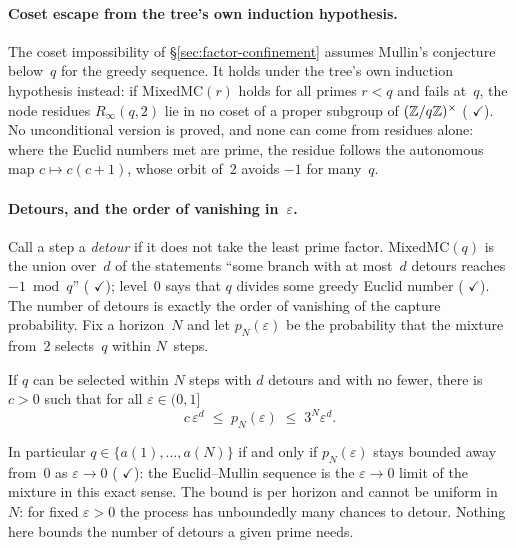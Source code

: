 \paragraph{Coset escape from the tree's own induction hypothesis.}
The coset impossibility of \S\ref{sec:factor-confinement} assumes
Mullin's conjecture below~$q$ for the greedy sequence.  It holds under
the tree's own induction hypothesis instead: if $\mathrm{MixedMC}(r)$
holds for all primes $r < q$ and fails at~$q$, the node residues
$R_\infty(q,2)$ lie in no coset of a proper subgroup of
$(\mathbb{Z}/q\mathbb{Z})^\times$
(
{\color{leanink}$\checkmark$}).
No unconditional version is proved, and none can come from residues
alone: where the Euclid numbers met are prime, the residue follows the
autonomous map $c \mapsto c(c{+}1)$, whose orbit of~$2$ avoids $-1$
for many~$q$.

\paragraph{Detours, and the order of vanishing in~$\varepsilon$.}
Call a step a \emph{detour} if it does not take the least prime
factor.  $\mathrm{MixedMC}(q)$ is the union over~$d$ of the statements
``some branch with at most~$d$ detours reaches $-1 \bmod q$''
( {\color{leanink}$\checkmark$}); level~$0$
says that $q$ divides some greedy Euclid number
( {\color{leanink}$\checkmark$}).
The number of detours is exactly the order of vanishing of the capture
probability.  Fix a horizon~$N$ and let $p_N(\varepsilon)$ be the
probability that the mixture from~$2$ selects~$q$ within $N$~steps.
\begin{theorem}
If $q$ can be selected within $N$ steps with $d$ detours and with no
fewer, there is $c > 0$ such that for all $\varepsilon \in (0,1]$
\[
  c\,\varepsilon^{d} \;\le\; p_N(\varepsilon) \;\le\; 3^{N}\varepsilon^{d}.
\]
\end{theorem}
\noindent
In particular $q \in \{a(1),\dots,a(N)\}$ if and only if
$p_N(\varepsilon)$ stays bounded away from~$0$ as $\varepsilon \to 0$
(
{\color{leanink}$\checkmark$}):
the Euclid--Mullin sequence is the $\varepsilon \to 0$ limit of the
mixture in this exact sense.  The bound is per horizon and cannot be
uniform in~$N$: for fixed $\varepsilon > 0$ the process has
unboundedly many chances to detour.  Nothing here bounds the number of
detours a given prime needs.

